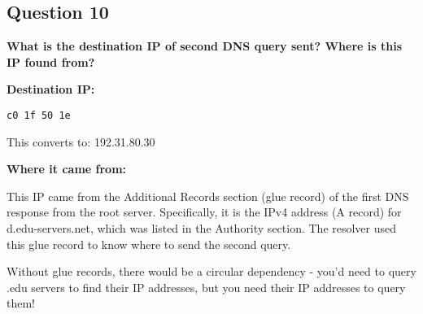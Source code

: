 \documentclass[11pt]{article}
\begin{document}
\subsection*{Question 10}
\textbf{What is the destination IP of second DNS query sent? Where is this IP found from?}

\textbf{Destination IP:}
\begin{lstlisting}
c0 1f 50 1e
\end{lstlisting}

This converts to: 192.31.80.30

\textbf{Where it came from:}

This IP came from the Additional Records section (glue record) of the first DNS response from the root server. Specifically, it is the IPv4 address (A record) for d.edu-servers.net, which was listed in the Authority section. The resolver used this glue record to know where to send the second query.

Without glue records, there would be a circular dependency - you'd need to query .edu servers to find their IP addresses, but you need their IP addresses to query them!
\end{document}
